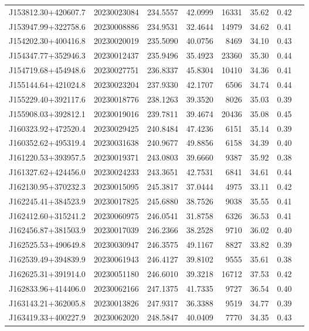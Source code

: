 \documentclass{article}
\begin{document}
\begin {longtable}{|l|l|r|r|r|r|r|l|}
 J153812.30+420607.7&  20230023084&  234.5557&   42.0999& 16331& 35.62& 0.42&\\
 J153947.99+322758.6&  20230008886&  234.9531&   32.4644& 14979& 34.62& 0.41&\\
 J154202.30+400416.8&  20230020019&  235.5090&   40.0756&  8469& 34.10& 0.43&\\
 J154347.77+352946.3&  20230012437&  235.9496&   35.4923& 23360& 35.30& 0.44&\\
 J154719.68+454948.6&  20230027751&  236.8337&   45.8304& 10410& 34.36& 0.41&\\
 J155144.64+421024.8&  20230023204&  237.9330&   42.1707&  6506& 34.74& 0.44&\\
 J155229.40+392117.6&  20230018776&  238.1263&   39.3520&  8026& 35.03& 0.39&\\
 J155908.03+392812.1&  20230019016&  239.7811&   39.4674& 20436& 35.08& 0.45&\\
 J160323.92+472520.4&  20230029425&  240.8484&   47.4236&  6151& 35.14& 0.39&\\
 J160352.62+495319.4&  20230031638&  240.9677&   49.8856&  6158& 34.39& 0.40&\\
 J161220.53+393957.5&  20230019371&  243.0803&   39.6660&  9387& 35.92& 0.38&\\
 J161327.62+424456.0&  20230024233&  243.3651&   42.7531&  6841& 34.61& 0.44&\\
 J162130.95+370232.3&  20230015095&  245.3817&   37.0444&  4975& 33.11& 0.42&\\
 J162245.41+384523.9&  20230017825&  245.6880&   38.7526&  9038& 35.55& 0.41&\\
 J162412.60+315241.2&  20230060975&  246.0541&   31.8758&  6326& 36.53& 0.41&\\
 J162456.87+381503.9&  20230017039&  246.2366&   38.2528&  9710& 36.02& 0.40&\\
 J162525.53+490649.8&  20230030947&  246.3575&   49.1167&  8827& 33.82& 0.39&\\
 J162539.49+394839.9&  20230061943&  246.4127&   39.8102&  9555& 35.61& 0.38&\\
 J162625.31+391914.0&  20230051180&  246.6010&   39.3218& 16712& 37.53& 0.42&\\
 J162833.96+414406.0&  20230062166&  247.1375&   41.7335&  9727& 36.54& 0.40&\\
 J163143.21+362005.8&  20230013826&  247.9317&   36.3388&  9519& 34.77& 0.39&\\
 J163419.33+400227.9&  20230062020&  248.5847&   40.0409&  7770& 34.35& 0.43&\\

\end{longtable}
\end{document}
